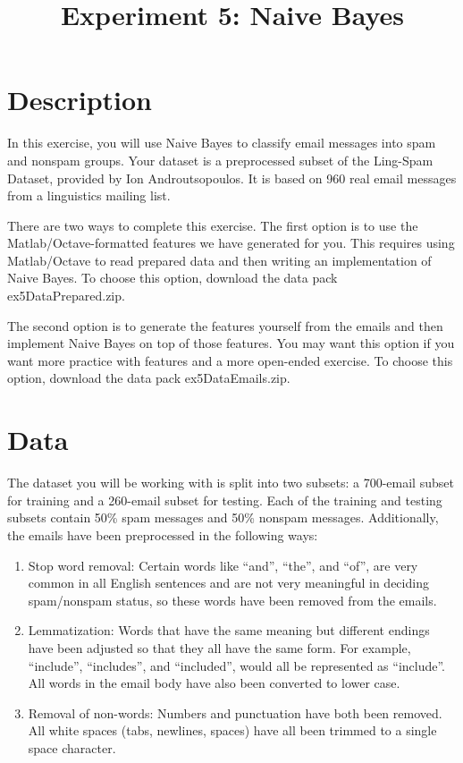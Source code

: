 \documentclass[10pt,a4paper]{article}
\begin{document}
\title{Experiment 5: Naive Bayes}

\maketitle
  
\section{Description}
%
  In this exercise, you will use Naive Bayes to classify email messages into spam and nonspam groups. Your dataset is a preprocessed subset of the Ling-Spam Dataset, provided by Ion Androutsopoulos. It is based on 960 real email messages from a linguistics mailing list.

  There are two ways to complete this exercise. The first option is to use the Matlab/Octave-formatted features we have generated for you. This requires using Matlab/Octave to read prepared data and then writing an implementation of Naive Bayes. To choose this option, download the data pack ex5DataPrepared.zip.

  The second option is to generate the features yourself from the emails and then implement Naive Bayes on top of those features. You may want this option if you want more practice with features and a more open-ended exercise. To choose this option, download the data pack ex5DataEmails.zip.








\section{Data}
%

  The dataset you will be working with is split into two subsets: a 700-email subset for training and a 260-email subset for testing. Each of the training and testing subsets contain 50\% spam messages and 50\% nonspam messages. Additionally, the emails have been preprocessed in the following ways:
  \begin{enumerate}
    \item Stop word removal: Certain words like ``and'', ``the'', and ``of'', are very common in all English sentences and are not very meaningful in deciding spam/nonspam status, so these words have been removed from the emails.
    \item Lemmatization: Words that have the same meaning but different endings have been adjusted so that they all have the same form. For example, ``include'', ``includes'', and ``included'', would all be represented as ``include''. All words in the email body have also been converted to lower case.
    \item Removal of non-words: Numbers and punctuation have both been removed. All white spaces (tabs, newlines, spaces) have all been trimmed to a single space character.
  \end{enumerate}
\end{document}
